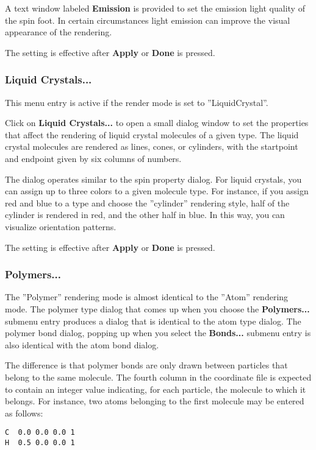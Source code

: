 \documentclass[11pt]{article}
\begin{document}
A text window labeled {\bf Emission} is provided to set the emission light
quality of the spin foot.  In certain circumstances light emission can improve
the visual appearance of the rendering.

The setting is effective after {\bf Apply} or {\bf Done} is pressed.

\subsubsection{Liquid Crystals...}

This menu entry is active if the render mode is set to ''LiquidCrystal''.

Click on {\bf Liquid Crystals...} to open a small dialog window to set the
properties that affect the rendering of liquid crystal molecules of a 
given type.  The liquid crystal molecules are rendered as lines, cones, 
or cylinders, with the startpoint and endpoint given by six columns of 
numbers.  

The dialog operates similar to the spin property dialog.  For liquid crystals,
you can assign up to three colors to a given molecule type.  For instance, 
if you assign red and blue to a type and choose the ''cylinder'' rendering
style, half of the cylinder is rendered in red, and the other half in blue. 
In this way, you can visualize orientation patterns.

The setting is effective after {\bf Apply} or {\bf Done} is pressed.

\subsubsection{Polymers...}

The ''Polymer'' rendering mode is almost identical to the ''Atom'' rendering
mode.  The polymer type dialog that comes up when you choose the 
{\bf Polymers...} submenu entry produces a dialog that is identical to the 
atom type dialog.  The polymer bond dialog, popping up when you select the 
{\bf Bonds...} submenu entry is also identical with the atom bond dialog. 

The difference is that polymer bonds are only drawn between particles that 
belong to the same molecule.  The fourth column in the coordinate file is 
expected to contain an integer value indicating, for each particle, the 
molecule to which it belongs.  For instance, two atoms belonging to the 
first molecule may be entered as follows:
\begin{verbatim}
C  0.0 0.0 0.0 1
H  0.5 0.0 0.0 1
\end{verbatim}
\end{document}
